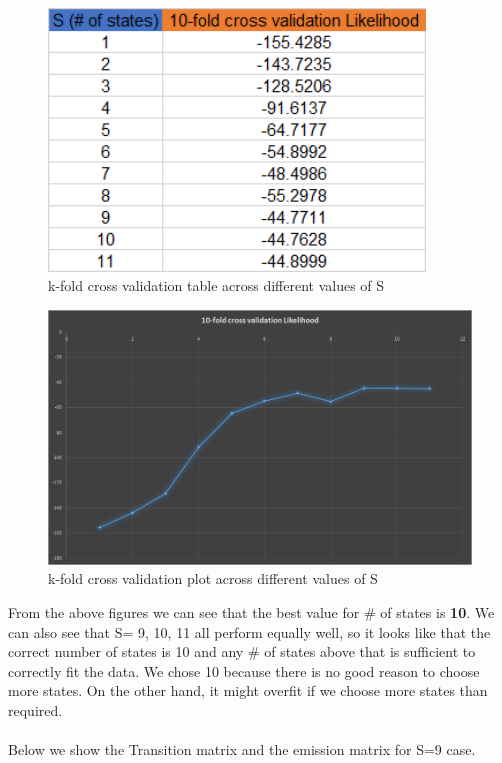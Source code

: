 \documentclass[12pt]{article}
\begin{document}
\begin{figure}[H]
\centering
\includegraphics[width=10cm]{table2.png}
\caption{k-fold cross validation table across different values of S}
\label{Fig1: k-fold cross validation table across different values of S}
\end{figure}

\begin{figure}[H]
\centering
\includegraphics[width=14cm]{sweepPlot2.jpg}
\caption{k-fold cross validation plot across different values of S}
\label{Fig1: k-fold cross validation plot across different values of S}
\end{figure}

From the above figures we can see that the best value for \# of states is \textbf{10}. We can also see that S= 9, 10, 11 all perform equally well, so it looks like that the correct number of states is 10 and any \# of states above that is sufficient to correctly fit the data. We chose 10 because there is no good reason to choose more states. On the other hand, it might overfit if we choose more states than required.\\ 
\\
Below we show the Transition matrix and the emission matrix for S=9 case.\\
\end{document}
